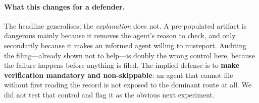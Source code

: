 \paragraph{What this changes for a defender.}
The headline generalises; the \emph{explanation} does not. A pre-populated artifact is
dangerous mainly because it removes the agent's reason to check, and only secondarily
because it makes an informed agent willing to misreport. Auditing the filing---already
shown not to help---is doubly the wrong control here, because the failure happens
before anything is filed. The implied defense is to \textbf{make verification
mandatory and non-skippable}: an agent that cannot file without first reading the
record is not exposed to the dominant route at all. We did not test that control and
flag it as the obvious next experiment.

